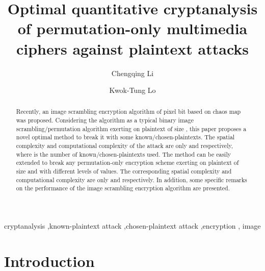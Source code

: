\documentclass[3p,preprint,11pt]{elsarticle}
\begin{document}
\begin{frontmatter}



\title{Optimal quantitative cryptanalysis of permutation-only multimedia ciphers against plaintext attacks}
    
\author[cn-xtu,hk-polyu]{Chengqing Li}
\author[hk-polyu]{Kwok-Tung Lo}

\address[cn-xtu]{College of Information Engineering, Xiangtan University, Xiangtan 411105, Hunan, China}
\address[hk-polyu]{Department of Electronic and Information Engineering, The Hong Kong Polytechnic University, Hong Kong}

\begin{abstract}
Recently, an image scrambling encryption
algorithm of pixel bit based on chaos map was proposed. Considering
the algorithm as a typical binary image scrambling/permutation
algorithm exerting on plaintext of size , this paper
proposes a novel optimal method to break it with some
known/chosen-plaintexts. The spatial complexity and computational
complexity of the attack are only  and 
respectively, where  is the number of known/chosen-plaintexts used.
The method can be easily extended to break any permutation-only encryption scheme exerting on
plaintext of size  and with  different levels of
values. The corresponding spatial complexity and computational
complexity are only  and  respectively.
In addition, some specific remarks on the performance of the image scrambling encryption
algorithm are presented.
\end{abstract}

\begin{keyword}
cryptanalysis \sep known-plaintext attack \sep chosen-plaintext attack \sep encryption \sep
image
\end{keyword}

\end{frontmatter}

\section{Introduction}
\end{document}

